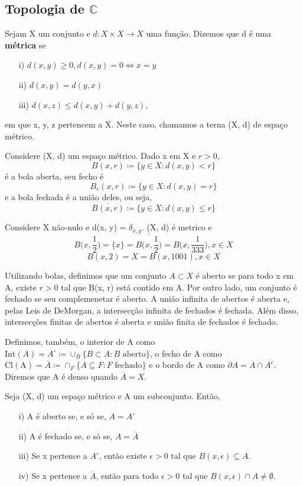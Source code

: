 \documentclass[ComplexAnalysis/complex.tex]{subfiles}
\begin{document}
\subsection{Topologia de $\mathbb{C}$}
\begin{def*}
	Sejam X um conjunto e $d:X\times{X}\rightarrow X$ uma função. Dizemos que d é uma \textbf{métrica} se
	\begin{itemize}
		\item[i)] $d(x, y) \geq{0}, d(x, y) = 0\Longleftrightarrow x=y$
		\item[ii)] $d(x, y) = d(y, x)$
		\item[iii)] $d(x, z) \leq d(x, y) + d(y, z)$,
	\end{itemize}
	em que x, y, z pertencem a X. Neste caso, chamamos a terna (X, d) de espaço métrico.
\end{def*}
Considere (X, d) um espaço métrico. Dado x em X e $r > 0$,
$$
	B(x, r)\coloneqq  \{y\in{X}: d(x, y)< r\}
$$
é a bola aberta, seu fecho é
$$
	B_c(x, r)\coloneqq  \{y\in{X}: d(x, y) = r\}
$$
e a bola fechada é a união deles, ou seja,
$$
	\overline{B(x, r)}\coloneqq  \{y\in{X}: d(x, y) \leq{r}\}
$$
\begin{example}
	Considere X não-nulo e d(x, y) = $\delta _{x,y}.$ (X, d) é metrico e
	$$
		B\biggl(x, \frac{1}{2}\biggr) = \{x\} = \overline{B\biggl(x, \frac{1}{2}\biggr)} = B\biggl(x, \frac{1}{333}\biggr), x\in{X}
	$$
	$$
		B(x, 2) = X = B(x, 1001), x\in{X}
	$$
\end{example}
Utilizando bolas, definimos que um conjunto $A\subset{X}$ é aberto se para todo x em A, existe $r > 0$ tal que
B(x, r) está contido em A. Por outro lado, um conjunto é fechado se seu complemenetar é aberto. A união infinita
de abertos é aberta e, pelas Leis de DeMorgan, a intersecção infinita de fechados é fechada. Além disso, intersecções
finitas de abertos é aberta e união finita de fechados é fechado.

Definimos, também, o interior de A como $\mathrm{Int}(A) = A^{\circ}\coloneqq  \cup_{B} \{B\subset{A}: B \text{ aberto}\}$, o fecho de A
como $\mathrm{Cl(A)} = \overline{A} \coloneqq  \cap_{F} \{A\subseteq{F}: F \text{ fechado}\}$ e o bordo de A como $\partial{A} = \overline{A}\cap\overline{A^c}.$
Diremos que A é denso quando $\overline{A} = X.$
\begin{prop*}
	Seja (X, d) um espaço métrico e A um subconjunto. Então,
	\begin{itemize}
		\item[i)] A é aberto se, e só se, $A = A^{\circ}$
		\item[ii)] A é fechado se, e só se, $A = \overline{A}$
		\item[iii)] Se x pertence a $A^{\circ}$, então existe $\epsilon>0$ tal que $B(x, \epsilon)\subseteq{A}$.
		\item[iv)] Se x pertence a $\overline{A}$, então para todo $\epsilon > 0$ tal que $B(x, \epsilon)\cap{A}\neq\emptyset$.
	\end{itemize}
\end{prop*}
\end{document}
